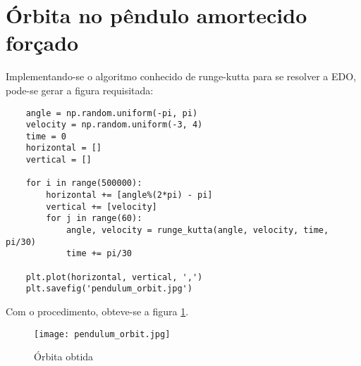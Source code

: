 \documentclass{article}[twocolumn]
\begin{document}
	\section{Órbita no pêndulo amortecido forçado}
	Implementando-se o algoritmo conhecido de runge-kutta para se resolver a EDO, pode-se gerar a figura requisitada:
	\begin{verbatim}
	angle = np.random.uniform(-pi, pi)
	velocity = np.random.uniform(-3, 4)
	time = 0
	horizontal = []
	vertical = []
	
	for i in range(500000):
    	horizontal += [angle%(2*pi) - pi]
    	vertical += [velocity]
    	for j in range(60):
        	angle, velocity = runge_kutta(angle, velocity, time, pi/30)
        	time += pi/30
	
	plt.plot(horizontal, vertical, ',')
	plt.savefig('pendulum_orbit.jpg')
	\end{verbatim}
	Com o procedimento, obteve-se a figura \ref{fig:chaos_pendulum}.
	\begin{figure}[H]
		\centering
		\texttt{[image: pendulum\_orbit.jpg]}
		\caption{Órbita obtida}
		\label{fig:chaos_pendulum}
	\end{figure}
\end{document}
